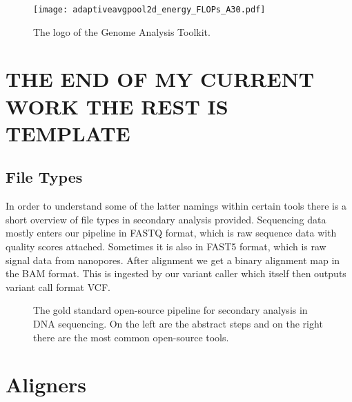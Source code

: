 \documentclass[conference]{IEEEtran}
\begin{document}
\begin{figure}
    \texttt{[image: adaptiveavgpool2d\_energy\_FLOPs\_A30.pdf]}
    \caption{The logo of the Genome Analysis Toolkit.}
    \label{fig:your_label}
\end{figure}




\section{THE END OF MY CURRENT WORK THE REST IS TEMPLATE}

\subsection{File Types}
In order to understand some of the latter namings within certain tools there is a short overview of file types in secondary analysis provided. Sequencing data mostly enters our pipeline in FASTQ format, which is raw sequence data with quality scores attached. Sometimes it is also in FAST5 format, which is raw signal data from nanopores. After alignment we get a binary alignment map in the BAM format. This is ingested by our variant caller which itself then outputs variant call format VCF. \\




    
\begin{figure}
    \centering
    \caption{The gold standard open-source pipeline for secondary analysis in DNA sequencing. On the left are the abstract steps and on the right there are the most common open-source tools.}
    \label{fig:enter-label}
\end{figure}

\section{Aligners}
\end{document}
